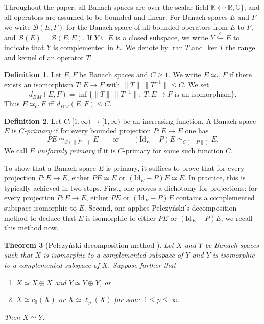 \documentclass[11pt]{amsart}
\theoremstyle{plain}
\newtheorem{theorem}{Theorem}[section]
\theoremstyle{definition}
\newtheorem{definition}[theorem]{Definition}
\numberwithin{equation}{section}
\newcommand{\norm}[1]{\lVert #1 \rVert}
\newcommand{\Bop}{\mathcal{B}}
\newcommand{\Id}{\mathrm{Id}}
\renewcommand{\le}{\leqslant}
\renewcommand{\ge}{\geqslant}
\renewcommand{\leq}{\leqslant}
\begin{document}
Throughout the paper, all Banach spaces are over the scalar field $\mathbb K\in\{\mathbb R,\mathbb C\}$, and all operators are assumed to be bounded and linear. For Banach spaces $E$ and $F$ we write $\Bop(E,F)$ for the Banach space of all bounded operators from $E$ to $F$, and $\Bop(E)=\Bop(E,E)$. If $Y\subseteq E$ is a closed subspace, we write $Y\stackrel{c}{\hookrightarrow}E$ to indicate that $Y$ is complemented in $E$. We denote by $\operatorname{ran}T$ and $\ker T$ the range and kernel of an operator $T$.


\begin{definition}
Let $E,F$ be Banach spaces and $C\ge 1$. We write $E\simeq_C F$ if there exists an isomorphism
$T\colon E\to F$ with $\norm{T}\,\norm{T^{-1}}\le C$. We set
\[
d_{BM}(E,F)=\inf\{\norm{T}\,\| T^{-1} \|:\ T\colon E\to F\text{ is an isomorphism}\}.
\]
Thus $E\simeq_C F$ iff $d_{BM}(E,F)\le C$.
\end{definition}

\begin{definition}
Let $C \colon [1,\infty) \to [1,\infty)$ be an increasing function. A Banach space $E$ is \emph{$C$-primary} if for every bounded projection $P\colon E\to E$ one has
\[
PE\simeq_{C(\norm{P})} E
\qquad\text{or}\qquad
(\Id_E-P)E\simeq_{C(\norm{P})} E.
\]
We call $E$ \emph{uniformly primary} if it is $C$-primary for some such function $C$.
\end{definition}


To show that a Banach space $E$ is primary, it suffices to prove that for every projection $P \colon E \to E$, either $PE \simeq E$ or $(\Id_E - P)E \simeq E$. In practice, this is typically achieved in two steps. First, one proves a dichotomy for projections: for every projection $P \colon E \to E$, either $PE$ or $(\Id_E - P)E$ contains a complemented subspace isomorphic to $E$. Second, one applies Pe{\l}czy\'nski's decomposition method to deduce that $E$ is isomorphic to either $PE$ or $(\Id_E - P)E$; we recall this method now.

\begin{theorem}[Pe{\l}czy\'nski decomposition method \cite{Pelczynski1960}] \label{th: pelcdecmethod}
    Let $X$ and $Y$ be Banach spaces such that $X$ is isomorphic to a complemented subspace of $Y$ and $Y$ is isomorphic to a complemented subspace of $X$. Suppose further that
    \begin{enumerate}[label = (\alph*), ref = (\alph*)]
        \item \label{dec:methoda} $X \simeq X \oplus X$ and $Y \simeq Y \oplus Y$, or
        \item \label{dec:methodb} $X \simeq c_0(X)$ or $X \simeq \ell_p(X)$ for some $1 \leq p \leq \infty$.
    \end{enumerate}
    Then $X \simeq Y$.
\end{theorem}
\end{document}
